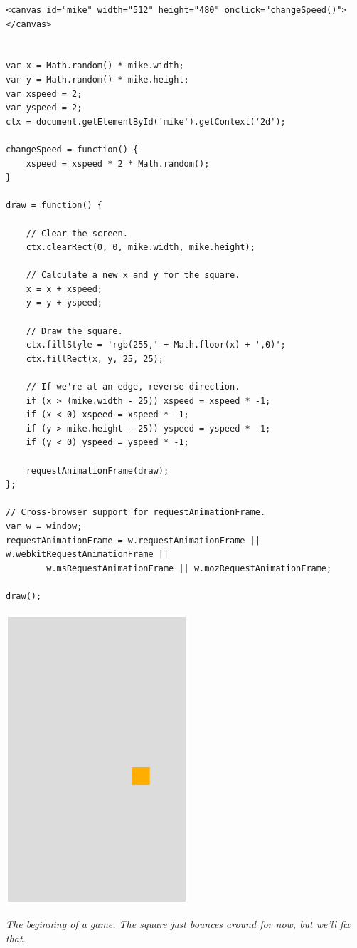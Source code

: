 \documentclass[11pt]{article}
\newcommand{\capt}[1]{\begin{minipage}{0.75\columnwidth}\itshape#1\end{minipage}}
\begin{document}
\vspace{-15pt}
\begin{verbatim}
<canvas id="mike" width="512" height="480" onclick="changeSpeed()"></canvas>


var x = Math.random() * mike.width;
var y = Math.random() * mike.height;
var xspeed = 2;
var yspeed = 2;
ctx = document.getElementById('mike').getContext('2d');

changeSpeed = function() {
    xspeed = xspeed * 2 * Math.random();
}

draw = function() {

    // Clear the screen.
    ctx.clearRect(0, 0, mike.width, mike.height);

    // Calculate a new x and y for the square.
    x = x + xspeed;
    y = y + yspeed;

    // Draw the square.
    ctx.fillStyle = 'rgb(255,' + Math.floor(x) + ',0)';
    ctx.fillRect(x, y, 25, 25);

    // If we're at an edge, reverse direction.
    if (x > (mike.width - 25)) xspeed = xspeed * -1;
    if (x < 0) xspeed = xspeed * -1;
    if (y > mike.height - 25)) yspeed = yspeed * -1;
    if (y < 0) yspeed = yspeed * -1;

    requestAnimationFrame(draw);
};

// Cross-browser support for requestAnimationFrame.
var w = window;
requestAnimationFrame = w.requestAnimationFrame || w.webkitRequestAnimationFrame ||
        w.msRequestAnimationFrame || w.mozRequestAnimationFrame;

draw();
\end{verbatim}

\begin{center}
\includegraphics[width=0.5\columnwidth]{game-first.png}

\capt{The beginning of a game.  The square just bounces around for
  now, but we'll fix that.}
\end{center}
\end{document}
